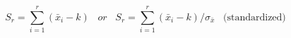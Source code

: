 

\[
S_r = \sum_{i=1}^{r}{(\bar{x}_i - k)} \;\;\; or \;\;\; S_r = \sum_{i=1}^{r}{(\bar{x}_i - k)/\sigma_{\bar{x}}} \;\;\; \mbox{(standardized)}
\]


